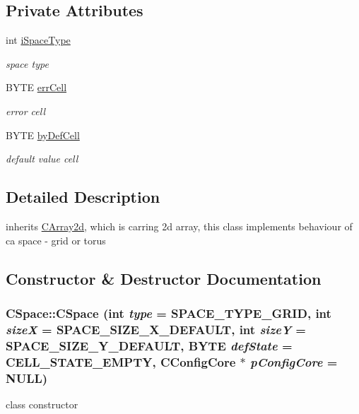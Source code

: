 \subsection*{Private Attributes}
\begin{DoxyCompactItemize}
\item 
\hypertarget{classCSpace_aedf34dc29d187ea531d730770c74ea5a}{
int \hyperlink{classCSpace_aedf34dc29d187ea531d730770c74ea5a}{iSpaceType}}
\label{classCSpace_aedf34dc29d187ea531d730770c74ea5a}

\begin{DoxyCompactList}\small\item\em space type \item\end{DoxyCompactList}\item 
\hypertarget{classCSpace_a963d2dc89ef63e9a33322561e79a9501}{
BYTE \hyperlink{classCSpace_a963d2dc89ef63e9a33322561e79a9501}{errCell}}
\label{classCSpace_a963d2dc89ef63e9a33322561e79a9501}

\begin{DoxyCompactList}\small\item\em error cell \item\end{DoxyCompactList}\item 
\hypertarget{classCSpace_a4373c80fe05795c2f18d3160d57315a8}{
BYTE \hyperlink{classCSpace_a4373c80fe05795c2f18d3160d57315a8}{byDefCell}}
\label{classCSpace_a4373c80fe05795c2f18d3160d57315a8}

\begin{DoxyCompactList}\small\item\em default value cell \item\end{DoxyCompactList}\end{DoxyCompactItemize}


\subsection{Detailed Description}
inherits \hyperlink{classCArray2d}{CArray2d}, which is carring 2d array, this class implements behaviour of ca space -\/ grid or torus 

\subsection{Constructor \& Destructor Documentation}
\hypertarget{classCSpace_ab795395372f17e257fa72988e10b206f}{
\subsubsection[{CSpace}]{\setlength{\rightskip}{0pt plus 5cm}CSpace::CSpace (int {\em type} = {\ttfamily SPACE\_\-TYPE\_\-GRID}, \/  int {\em sizeX} = {\ttfamily SPACE\_\-SIZE\_\-X\_\-DEFAULT}, \/  int {\em sizeY} = {\ttfamily SPACE\_\-SIZE\_\-Y\_\-DEFAULT}, \/  BYTE {\em defState} = {\ttfamily CELL\_\-STATE\_\-EMPTY}, \/  {\bf CConfigCore} $\ast$ {\em pConfigCore} = {\ttfamily NULL})}}
\label{classCSpace_ab795395372f17e257fa72988e10b206f}
class constructor



